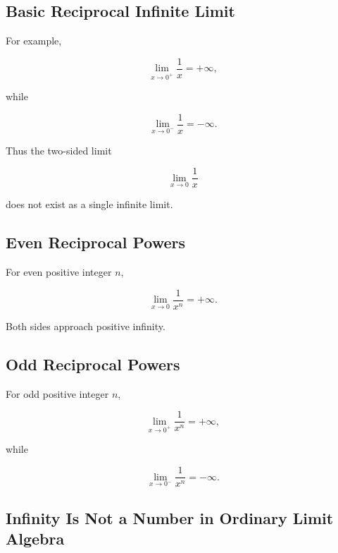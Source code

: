 \subsection{Basic Reciprocal Infinite Limit}
\label{subsec:reciprocal-infinite-limit}

For example,

\[
\boxed{
\lim_{x\to0^+}
\frac1x
=
+\infty,
}
\]

while

\[
\boxed{
\lim_{x\to0^-}
\frac1x
=
-\infty.
}
\]

Thus the two-sided limit

\[
\lim_{x\to0}\frac1x
\]

does not exist as a single infinite limit.

\subsection{Even Reciprocal Powers}
\label{subsec:even-reciprocal-infinite-limit}

For even positive integer \(n\),

\[
\boxed{
\lim_{x\to0}
\frac1{x^n}
=
+\infty.
}
\]

Both sides approach positive infinity.

\subsection{Odd Reciprocal Powers}
\label{subsec:odd-reciprocal-infinite-limit}

For odd positive integer \(n\),

\[
\boxed{
\lim_{x\to0^+}
\frac1{x^n}
=
+\infty,
}
\]

while

\[
\boxed{
\lim_{x\to0^-}
\frac1{x^n}
=
-\infty.
}
\]

\subsection{Infinity Is Not a Number in Ordinary Limit Algebra}
\label{subsec:infinity-not-number}


